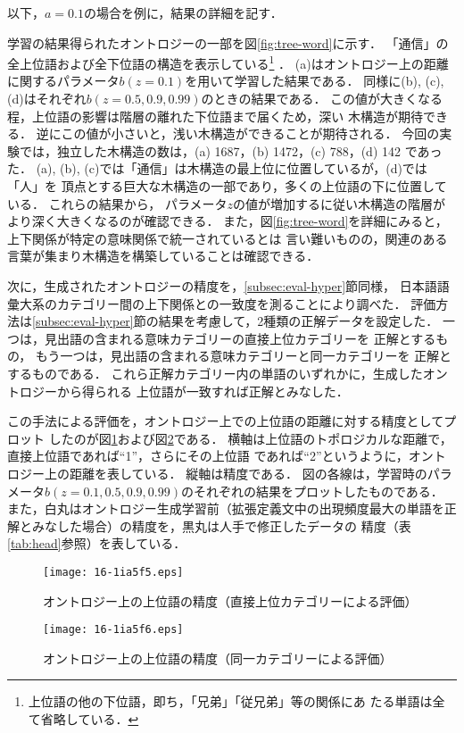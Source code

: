 \documentclass[japanese]{jnlp_1.4}
\begin{document}
以下，$a=0.1$の場合を例に，結果の詳細を記す．

学習の結果得られたオントロジーの一部を図\ref{fig:tree-word}に示す．
「通信」の全上位語および全下位語の構造を表示している\footnote{
上位語の他の下位語，即ち，「兄弟」「従兄弟」等の関係にあ
たる単語は全て省略している．}
．
(a)はオントロジー上の距離に関するパラメータ$b(z=0.1)$を用いて学習した結果である．
同様に(b), (c), (d)はそれぞれ$b(z=0.5,0.9,0.99)$のときの結果である．
この値が大きくなる程，上位語の影響は階層の離れた下位語まで届くため，深い
木構造が期待できる．
逆にこの値が小さいと，浅い木構造ができることが期待される．
今回の実験では，独立した木構造の数は，(a) 1687，(b) 1472，(c) 788，(d) 142
であった．
(a), (b), (c)では「通信」は木構造の最上位に位置しているが，(d)では「人」を
頂点とする巨大な木構造の一部であり，多くの上位語の下に位置している．
これらの結果から，
パラメータ$z$の値が増加するに従い木構造の階層がより深く大きくなるのが確認できる．
また，図\ref{fig:tree-word}を詳細にみると，上下関係が特定の意味関係で統一されているとは
言い難いものの，関連のある言葉が集まり木構造を構築していることは確認できる．

次に，生成されたオントロジーの精度を，\ref{subsec:eval-hyper}節同様，
日本語語彙大系のカテゴリー間の上下関係との一致度を測ることにより調べた． 
評価方法は\ref{subsec:eval-hyper}節の結果を考慮して，2種類の正解データを設定した．
一つは，見出語の含まれる意味カテゴリーの直接上位カテゴリーを
正解とするもの，
もう一つは，見出語の含まれる意味カテゴリーと同一カテゴリーを
正解とするものである．
これら正解カテゴリー内の単語のいずれかに，生成したオントロジーから得られる
上位語が一致すれば正解とみなした．

この手法による評価を，オントロジー上での上位語の距離に対する精度としてプロット
したのが図\ref{fig:eval-direct}および図\ref{fig:eval-all}である．
横軸は上位語のトポロジカルな距離で，直接上位語であれば``1''，さらにその上位語
であれば``2''というように，オントロジー上の距離を表している．
縦軸は精度である．
図の各線は，学習時のパラメータ$b(z=0.1,0.5,0.9,0.99)$のそれぞれの結果をプロットしたものである．
また，白丸はオントロジー生成学習前（拡張定義文中の出現頻度最大の単語を正解とみなした場合）の精度を，黒丸は人手で修正したデータの
精度（表\ref{tab:head}参照）を表している．

\begin{figure}[t]
\begin{center}
\texttt{[image: 16-1ia5f5.eps]}
\end{center}
\caption{オントロジー上の上位語の精度（直接上位カテゴリーによる評価）}
\label{fig:eval-direct}
\end{figure}
\begin{figure}[t]
\begin{center}
\texttt{[image: 16-1ia5f6.eps]}
\end{center}
\caption{オントロジー上の上位語の精度（同一カテゴリーによる評価）}
\label{fig:eval-all}
\vspace{-1.5\baselineskip}
\end{figure}
\end{document}
